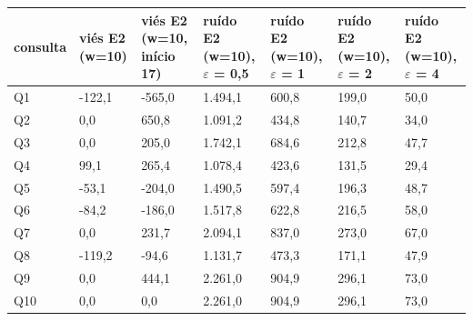 \begin{tabular}{lllllll}
\toprule
consulta & viés E2 (w=10) & viés E2 (w=10, início 17) & ruído E2 (w=10), $\varepsilon$ = 0,5 & ruído E2 (w=10), $\varepsilon$ = 1 & ruído E2 (w=10), $\varepsilon$ = 2 & ruído E2 (w=10), $\varepsilon$ = 4 \\
\midrule
Q1 & -122,1 & -565,0 & 1.494,1 & 600,8 & 199,0 & 50,0 \\
Q2 & 0,0 & 650,8 & 1.091,2 & 434,8 & 140,7 & 34,0 \\
Q3 & 0,0 & 205,0 & 1.742,1 & 684,6 & 212,8 & 47,7 \\
Q4 & 99,1 & 265,4 & 1.078,4 & 423,6 & 131,5 & 29,4 \\
Q5 & -53,1 & -204,0 & 1.490,5 & 597,4 & 196,3 & 48,7 \\
Q6 & -84,2 & -186,0 & 1.517,8 & 622,8 & 216,5 & 58,0 \\
Q7 & 0,0 & 231,7 & 2.094,1 & 837,0 & 273,0 & 67,0 \\
Q8 & -119,2 & -94,6 & 1.131,7 & 473,3 & 171,1 & 47,9 \\
Q9 & 0,0 & 444,1 & 2.261,0 & 904,9 & 296,1 & 73,0 \\
Q10 & 0,0 & 0,0 & 2.261,0 & 904,9 & 296,1 & 73,0 \\
\bottomrule
\end{tabular}
